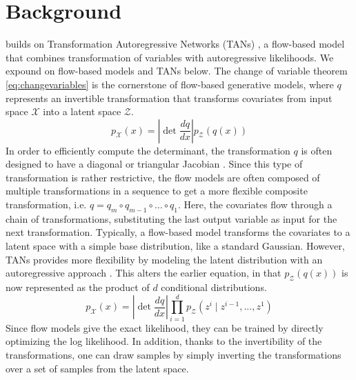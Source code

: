 \documentclass[letterpaper]{article} %
\begin{document}
\section{Background}
builds on Transformation Autoregressive Networks (TANs) , a flow-based model that combines transformation of variables with autoregressive likelihoods.
We expound on flow-based models and TANs below.
The change of variable theorem \eqref{eq:changevariables} is the cornerstone of flow-based generative models, where $q$ represents an invertible transformation that transforms covariates from input space $\mathcal{X}$ into a latent space $\mathcal{Z}$.
\begin{equation}
    p_{\mathcal{X}}(x) = \left| \det \frac{dq}{dx} \right| p_{\mathcal{Z}}(q(x))
\end{equation}
In order to efficiently compute the determinant, the transformation $q$ is often designed to have a diagonal or triangular Jacobian . Since this type of transformation is rather restrictive, the flow models are often composed of multiple transformations in a sequence to get a more flexible composite transformation, i.e. $q = q_m \circ q_{m-1} \circ \ldots \circ q_1$. Here, the covariates flow through a chain of transformations, substituting the last output variable as input for the next transformation.
Typically, a flow-based model transforms the covariates to a latent space with a simple base distribution, like a standard Gaussian. However, TANs provides more flexibility by modeling the latent distribution with an autoregressive approach . This alters the earlier equation, in that $p_{\mathcal{Z}}(q(x))$ is now represented as the product of $d$ conditional distributions.
\begin{equation}
    p_{\mathcal{X}}(x) = \left| \det \frac{dq}{dx} \right| \prod_{i=1}^d p_{\mathcal{Z}}(z^i \mid z^{i-1},...,z^{1})
\end{equation}
Since flow models give the exact likelihood, they can be trained by directly optimizing the log likelihood. In addition, thanks to the invertibility of the transformations, one can draw samples by simply inverting the transformations over a set of samples from the latent space.
\end{document}
